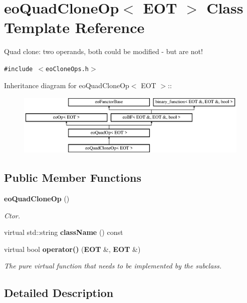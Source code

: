 \section{eo\-Quad\-Clone\-Op$<$ EOT $>$ Class Template Reference}
\label{classeo_quad_clone_op}
Quad clone: two operands, both could be modified - but are not!  


{\tt \#include $<$eo\-Clone\-Ops.h$>$}

Inheritance diagram for eo\-Quad\-Clone\-Op$<$ EOT $>$::\begin{figure}[H]
\begin{center}
\leavevmode
\includegraphics[height=2.96296cm]{classeo_quad_clone_op}
\end{center}
\end{figure}
\subsection*{Public Member Functions}
\begin{CompactItemize}
\item 
{\bf eo\-Quad\-Clone\-Op} ()\label{classeo_quad_clone_op_a0}

\begin{CompactList}\small\item\em Ctor. \item\end{CompactList}\item 
virtual std::string {\bf class\-Name} () const \label{classeo_quad_clone_op_a1}

\item 
virtual bool {\bf operator()} ({\bf EOT} \&, {\bf EOT} \&)\label{classeo_quad_clone_op_a2}

\begin{CompactList}\small\item\em The pure virtual function that needs to be implemented by the subclass. \item\end{CompactList}\end{CompactItemize}


\subsection{Detailed Description}
